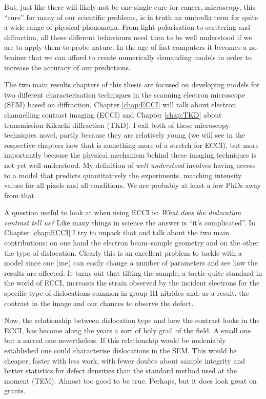 But, just like there will likely not be one single cure for cancer, microscopy, this ``cure'' for many of our scientific problems, is in truth an umbrella term for quite a wide range of physical phenomena. From light polarisation to scattering and diffraction, all these different behaviours need then to be well understood if we are to apply them to probe nature. In the age of fast computers it becomes a no-brainer that we can afford to create numerically demanding models in order to increase the accuracy of our predictions.  

The two main results chapters of this thesis are focused on developing models for two different characterisation techniques in the scanning electron microscope (SEM) based on diffraction. Chapter \ref{chap:ECCI} will talk about electron channelling contrast imaging (ECCI) and Chapter \ref{chap:TKD} about transmission Kikuchi diffraction (TKD). I call both of these microscopy techniques novel, partly because they are relatively young (we will see in the respective chapters how that is something more of a stretch for ECCI),  but more importantly because the physical mechanism behind these imaging techniques is not yet well understood. My definition of \textit{well understood} involves having access to a model that predicts quantitatively the experiments, matching intensity values for all pixels and all conditions. We are probably at least a few PhDs away from that.

A question useful to look at when using ECCI is: \textit{What does the dislocation contrast tell us?} Like many things in science the answer is ``it's complicated''. In Chapter \ref{chap:ECCI} I try to unpack that and talk about the two main contributions: on one hand the electron beam--sample geometry and on the other the type of dislocation. Clearly this is an excellent problem to tackle with a model since one (me) can easily change a number of parameters and see how the results are affected. It turns out that tilting the sample, a tactic quite standard in the world of ECCI, increases the strain observed by the incident electrons for the specific type of dislocations common in group-III nitrides and, as a result, the contrast in the image and our chances to observe the defect. 

Now, the relationship between dislocation type and how the contrast looks in the ECCI, has become along the years a sort of holy grail of the field. A small one but a sacred one nevertheless. If this relationship would be undeniably established one could characterise dislocations in the SEM. This would be cheaper, faster with less work, with fewer doubts about sample integrity and better statistics for defect densities than the standard method used at the moment (TEM). Almost too good to be true. Perhaps, but it does look great on grants. 

